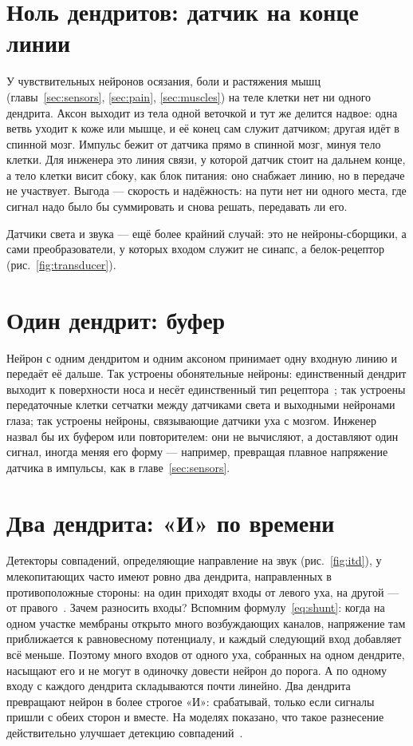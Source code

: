 \section{Ноль дендритов: датчик на конце линии}

У чувствительных нейронов осязания, боли и растяжения мышц (главы~\ref{sec:sensors}, \ref{sec:pain}, \ref{sec:muscles}) на теле клетки нет ни одного дендрита. Аксон выходит из тела одной веточкой и тут же делится надвое: одна ветвь уходит к коже или мышце, и её конец сам служит датчиком; другая идёт в спинной мозг. Импульс бежит от датчика прямо в спинной мозг, минуя тело клетки. Для инженера это линия связи, у которой датчик стоит на дальнем конце, а тело клетки висит сбоку, как блок питания: оно снабжает линию, но в передаче не участвует. Выгода --- скорость и надёжность: на пути нет ни одного места, где сигнал надо было бы суммировать и снова решать, передавать ли его.

Датчики света и звука --- ещё более крайний случай: это не нейроны-сборщики, а сами преобразователи, у которых входом служит не синапс, а белок-рецептор (рис.~\ref{fig:transducer}).

\section{Один дендрит: буфер}

Нейрон с одним дендритом и одним аксоном принимает одну входную линию и передаёт её дальше. Так устроены обонятельные нейроны: единственный дендрит выходит к поверхности носа и несёт единственный тип рецептора~\cite{Mombaerts2004}; так устроены передаточные клетки сетчатки между датчиками света и выходными нейронами глаза; так устроены нейроны, связывающие датчики уха с мозгом. Инженер назвал бы их буфером или повторителем: они не вычисляют, а доставляют один сигнал, иногда меняя его форму --- например, превращая плавное напряжение датчика в импульсы, как в главе~\ref{sec:sensors}.

\section{Два дендрита: «И» по времени}

Детекторы совпадений, определяющие направление на звук (рис.~\ref{fig:itd}), у млекопитающих часто имеют ровно два дендрита, направленных в противоположные стороны: на один приходят входы от левого уха, на другой --- от правого~\cite{Grothe2010}. Зачем разносить входы? Вспомним формулу~\eqref{eq:shunt}: когда на одном участке мембраны открыто много возбуждающих каналов, напряжение там приближается к равновесному потенциалу, и каждый следующий вход добавляет всё меньше. Поэтому много входов от одного уха, собранных на одном дендрите, насыщают его и не могут в одиночку довести нейрон до порога. А по одному входу с каждого дендрита складываются почти линейно. Два дендрита превращают нейрон в более строгое «И»: срабатывай, только если сигналы пришли с обеих сторон и вместе. На моделях показано, что такое разнесение действительно улучшает детекцию совпадений~\cite{AgmonSnir1998}.

